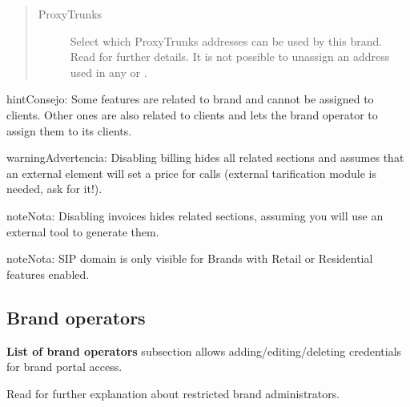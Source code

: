 \documentclass[letterpaper,10pt,spanish]{sphinxmanual}
\begin{document}
\begin{quote}
\begin{description}
\item[{ProxyTrunks}] \leavevmode
Select which ProxyTrunks addresses can be used by this brand. Read {\hyperref[administration_portal/platform/infrastructure/proxy_trunks:proxy\string-trunks]{}}
for further details. It is not possible to unassign an address used in any {\hyperref[administration_portal/brand/providers/carriers:carriers]{}} or
{\hyperref[administration_portal/brand/providers/ddi_providers:ddi\string-providers]{}}.

\end{description}
\end{quote}

\begin{notice}{hint}{Consejo:}
Some features are related to brand and cannot be assigned to clients.
Other ones are also related to clients and lets the brand operator to
assign them to its clients.
\end{notice}

\begin{notice}{warning}{Advertencia:}
Disabling billing hides all related sections and assumes that an
external element will set a price for calls (external tarification
module is needed, ask for it!).
\end{notice}

\begin{notice}{note}{Nota:}
Disabling invoices hides related sections, assuming you will use an
external tool to generate them.
\end{notice}

\begin{notice}{note}{Nota:}
SIP domain is only visible for Brands with Retail or Residential features
enabled.
\end{notice}


\subsection{Brand operators}
\label{administration_portal/platform/brands:id2}\label{administration_portal/platform/brands:brand-operators}
\textbf{List of brand operators} subsection allows adding/editing/deleting credentials for brand portal access.

Read {\hyperref[api_rest/acls:acls]{}} for further explanation about restricted brand administrators.
\end{document}
